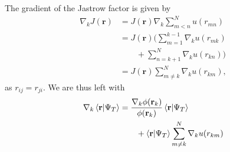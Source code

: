\documentclass[
    a4paper, aps, twocolumn, floatfix, superscriptaddress]{revtex4-1}
\newcommand{\vf}{\mathbf}
\newcommand{\1}{\mathds{1}}
\begin{document}
            The gradient of the Jastrow factor is given by
            \begin{align}
                \nabla_k J(\vf{r})
                &=
                J(\vf{r})
                \nabla_k\sum_{m < n}^N u(r_{mn}) \\
                &=
                J(\vf{r})
                \Biggl(
                    \sum_{m = 1}^{k - 1}
                    \nabla_k u(r_{mk}) \nonumber \\
                    &\qquad
                    +
                    \sum_{n = k + 1}^N
                    \nabla_k u(r_{kn})
                \Biggr) \\
                &=
                J(\vf{r})
                \sum_{m \neq k}^N\nabla_k u(r_{km}),
            \end{align}
            as $r_{ij} = r_{ji}$.  We are thus left with
            \begin{align}
                \nabla_k\bra{\vf{r}}\ket{\Psi_T}
                &=
                \frac{\nabla_k\phi(\vf{r}_k)}{\phi(\vf{r}_k)}
                \bra{\vf{r}}\ket{\Psi_T} \nonumber \\
                &\qquad
                + \bra{\vf{r}}\ket{\Psi_T}
                \sum_{m \neq k}^N\nabla_k u(r_{km})
            \end{align}
\end{document}
